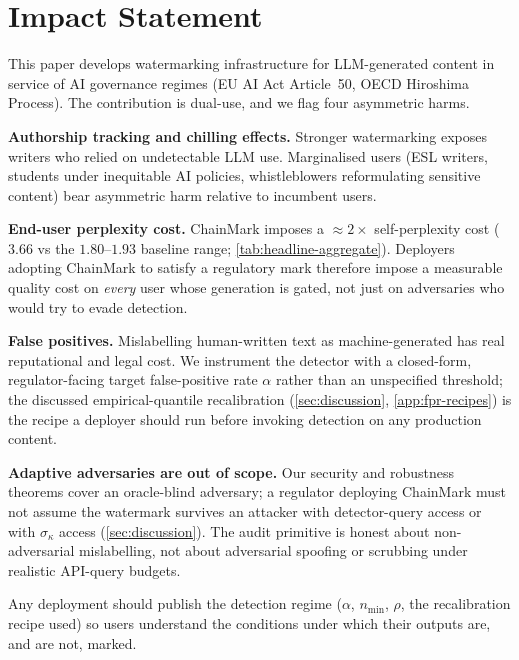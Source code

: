 \section*{Impact Statement}

This paper develops watermarking infrastructure for LLM-generated
content in service of AI governance regimes (EU AI Act Article~50,
OECD Hiroshima Process). The contribution is dual-use, and we
flag four asymmetric harms.

\textbf{Authorship tracking and chilling effects.} Stronger
watermarking exposes writers who relied on undetectable LLM use.
Marginalised users (ESL writers, students under inequitable AI
policies, whistleblowers reformulating sensitive content) bear
asymmetric harm relative to incumbent users.

\textbf{End-user perplexity cost.} ChainMark imposes a $\approx
2\times$ self-perplexity cost ($3.66$ vs the $1.80$--$1.93$ baseline
range; \autoref{tab:headline-aggregate}). Deployers adopting
ChainMark to satisfy a regulatory mark therefore impose a measurable
quality cost on \emph{every} user whose generation is gated, not
just on adversaries who would try to evade detection.

\textbf{False positives.} Mislabelling human-written text as
machine-generated has real reputational and legal cost. We
instrument the detector with a closed-form, regulator-facing target
false-positive rate $\alpha$ rather than an unspecified threshold;
the discussed empirical-quantile recalibration (\autoref{sec:discussion},
\autoref{app:fpr-recipes}) is the recipe a deployer should run
before invoking detection on any production content.

\textbf{Adaptive adversaries are out of scope.} Our security and
robustness theorems cover an oracle-blind adversary; a regulator
deploying ChainMark must not assume the watermark survives an
attacker with detector-query access or with $\sigma_\kappa$ access
(\autoref{sec:discussion}). The audit primitive is honest about
non-adversarial mislabelling, not about adversarial spoofing or
scrubbing under realistic API-query budgets.

Any deployment should publish the detection regime ($\alpha$,
$n_{\min}$, $\rho$, the recalibration recipe used) so users
understand the conditions under which their outputs are, and are
not, marked.
